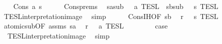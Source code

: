 \begin{isabellebody}
\isamarkupfalse%
\isanewline
\ \ \isamarkupfalse%
\ {\isacharparenleft}Cons\ a\ s{\isacharparenright}\isanewline
\ \ \ \ \isamarkupfalse%
\ Cons{\isachardot}prems\ \isamarkupfalse%
\ sa{\isacharcolon}{\isacartoucheopen}sub\ {\isasymin}\ {\isasymlbrakk}\ a\ {\isasymrbrakk}\isactrlsub T\isactrlsub E\isactrlsub S\isactrlsub L{\isacartoucheclose}\ \ sb{\isacharcolon}{\isacartoucheopen}sub\ {\isasymin}\ {\isasymlbrakk}{\isasymlbrakk}\ s\ {\isasymrbrakk}{\isasymrbrakk}\isactrlsub T\isactrlsub E\isactrlsub S\isactrlsub L{\isacartoucheclose}\isanewline
\ \ \ \ \ \ \isamarkupfalse%
\ TESL{\isacharunderscore}interpretation{\isacharunderscore}image\ \isamarkupfalse%
\ simp{\isacharplus}\isanewline
\ \ \ \ \isamarkupfalse%
\ Cons{\isachardot}IH{\isacharbrackleft}OF\ sb{\isacharbrackright}\ \isamarkupfalse%
\ {\isacartoucheopen}r\ {\isasymin}\ {\isasymlbrakk}{\isasymlbrakk}\ s\ {\isasymrbrakk}{\isasymrbrakk}\isactrlsub T\isactrlsub E\isactrlsub S\isactrlsub L{\isacartoucheclose}\ \isacommand{{\isachardot}}\isamarkupfalse%
\isanewline
\ \ \ \ \isamarkupfalse%
\ \isamarkupfalse%
\ atomic{\isacharunderscore}sub{\isacharbrackleft}OF\ assms{\isacharparenleft}{}{\isacharparenright}\ sa{\isacharbrackright}\ \isamarkupfalse%
\ {\isacartoucheopen}r\ {\isasymin}\ {\isasymlbrakk}\ a\ {\isasymrbrakk}\isactrlsub T\isactrlsub E\isactrlsub S\isactrlsub L{\isacartoucheclose}\ \isacommand{{\isachardot}}\isamarkupfalse%
\isanewline
\ \ \ \ \isamarkupfalse%
\ \isamarkupfalse%
\ {\isacharquery}case\ \isamarkupfalse%
\ \ TESL{\isacharunderscore}interpretation{\isacharunderscore}image\ \isamarkupfalse%
\ simp\isanewline
{}\isamarkupfalse%
%
\endisatagproof
{\isafoldproof}%
%
\isadelimproof
\isanewline
%
\endisadelimproof
%
\isadelimtheory
\isanewline
%
\endisadelimtheory
%
\isatagtheory
{}\isamarkupfalse%
%
\endisatagtheory
{\isafoldtheory}%
%
\isadelimtheory
%
\endisadelimtheory
%
\end{isabellebody}%
\endinput
